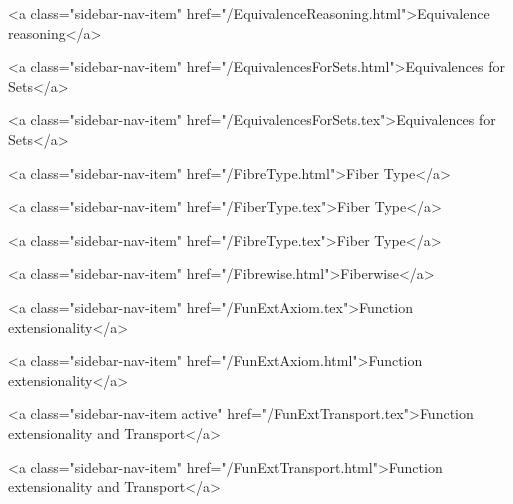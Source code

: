       
        
          <a class="sidebar-nav-item" href="/EquivalenceReasoning.html">Equivalence reasoning</a>
        
      
    
      
        
          <a class="sidebar-nav-item" href="/EquivalencesForSets.html">Equivalences for Sets</a>
        
      
    
      
        
          <a class="sidebar-nav-item" href="/EquivalencesForSets.tex">Equivalences for Sets</a>
        
      
    
      
        
          <a class="sidebar-nav-item" href="/FibreType.html">Fiber Type</a>
        
      
    
      
        
          <a class="sidebar-nav-item" href="/FiberType.tex">Fiber Type</a>
        
      
    
      
        
          <a class="sidebar-nav-item" href="/FibreType.tex">Fiber Type</a>
        
      
    
      
        
          <a class="sidebar-nav-item" href="/Fibrewise.html">Fiberwise</a>
        
      
    
      
        
          <a class="sidebar-nav-item" href="/FunExtAxiom.tex">Function extensionality</a>
        
      
    
      
        
          <a class="sidebar-nav-item" href="/FunExtAxiom.html">Function extensionality</a>
        
      
    
      
        
          <a class="sidebar-nav-item active" href="/FunExtTransport.tex">Function extensionality and Transport</a>
        
      
    
      
        
          <a class="sidebar-nav-item" href="/FunExtTransport.html">Function extensionality and Transport</a>
        
